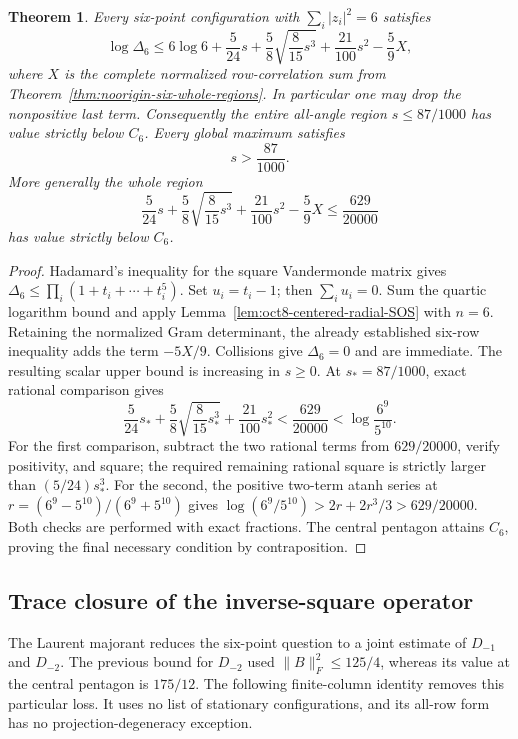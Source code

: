 \documentclass[11pt]{article}
\newtheorem{theorem}{Theorem}[section]
\theoremstyle{remark}
\numberwithin{equation}{section}
\begin{document}
\begin{theorem}\label{thm:oct8-six-radial-region}
Every six-point configuration with $\sum_i|z_i|^2=6$ satisfies
\[
 \log\Delta_6\le6\log6+\frac5{24}s
             +\frac58\sqrt{\frac8{15}s^3}+\frac{21}{100}s^2
                       -\frac59X,
\]
where $X$ is the complete normalized row-correlation sum from
Theorem~\ref{thm:noorigin-six-whole-regions}. In particular one may
drop the nonpositive last term.
Consequently the entire all-angle region $s\le87/1000$ has value
strictly below $C_6$. Every global maximum satisfies
\[
                             s>\frac{87}{1000}.
\]
More generally the whole region
\[
 \frac5{24}s+\frac58\sqrt{\frac8{15}s^3}
                        +\frac{21}{100}s^2-\frac59X
                         \le\frac{629}{20000}
\]
has value strictly below $C_6$.
\end{theorem}
\begin{proof}
Hadamard's inequality for the square Vandermonde matrix gives
$\Delta_6\le\prod_i(1+t_i+\cdots+t_i^5)$. Set $u_i=t_i-1$;
then $\sum_i u_i=0$. Sum the quartic logarithm bound and apply
Lemma~\ref{lem:oct8-centered-radial-SOS} with $n=6$.
Retaining the normalized Gram determinant, the already established
six-row inequality adds the term $-5X/9$. Collisions give $\Delta_6=0$
and are immediate.
The resulting scalar upper bound is increasing in $s\ge0$.
At $s_*=87/1000$, exact rational comparison gives
\[
 \frac5{24}s_*+\frac58\sqrt{\frac8{15}s_*^3}
                    +\frac{21}{100}s_*^2<\frac{629}{20000}
                       <\log\frac{6^9}{5^{10}}.
\]
For the first comparison, subtract the two rational terms from
$629/20000$, verify positivity, and square; the required remaining
rational square is strictly larger than $(5/24)s_*^3$.
For the second, the positive two-term atanh series at
$r=(6^9-5^{10})/(6^9+5^{10})$ gives
$\log(6^9/5^{10})>2r+2r^3/3>629/20000$.
Both checks are performed with exact fractions. The central pentagon
attains $C_6$, proving the final necessary condition by contraposition.
\end{proof}

\subsection{Trace closure of the inverse-square operator}

The Laurent majorant reduces the six-point question to a joint estimate
of $D_{-1}$ and $D_{-2}$. The previous bound for $D_{-2}$ used
$\|B\|_F^2\le125/4$, whereas its value at the central pentagon is
$175/12$. The following finite-column identity removes this particular
loss. It uses no list of stationary configurations, and its all-row form
has no projection-degeneracy exception.
\end{document}
